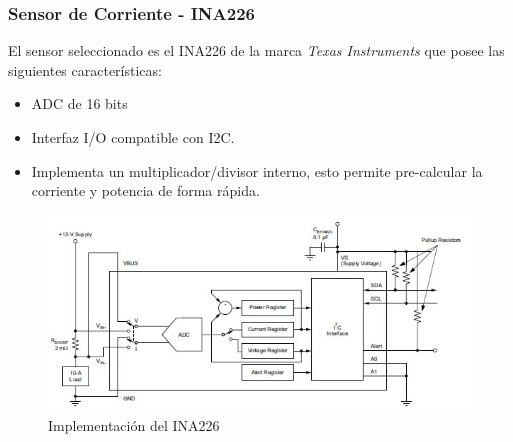 \documentclass[10pt]{beamer}
\theoremstyle{remark}
\theoremstyle{definition}
\begin{document}
\begin{frame}%
	\frametitle{Sensor de Corriente - INA226}
  	El sensor seleccionado es el INA226 de la marca \emph{Texas Instruments} que
  	posee las siguientes características:
  	\begin{itemize}
		\item 	ADC de 16 bits
		\item 	Interfaz I/O compatible con I2C.
		\item 	Implementa un multiplicador/divisor interno, esto permite pre-calcular
	  			la corriente y potencia de forma rápida.
  	\end{itemize}
  	\begin{figure}[h!]  
   		\centering
		\includegraphics[width=0.75\linewidth]{./images/INA226-Common_Implementation.jpg}
		\caption{Implementación del INA226}
		\label{sch_ina226}	
  	\end{figure}

\end{frame}
\end{document}
